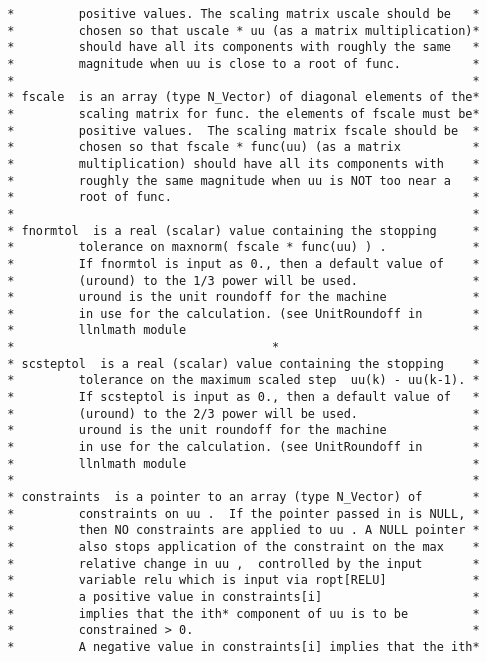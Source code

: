 \begin{verbatim}
 *         positive values. The scaling matrix uscale should be   *
 *         chosen so that uscale * uu (as a matrix multiplication)*
 *         should have all its components with roughly the same   *
 *         magnitude when uu is close to a root of func.          *
 *                                                                *
 * fscale  is an array (type N_Vector) of diagonal elements of the*
 *         scaling matrix for func. the elements of fscale must be*
 *         positive values.  The scaling matrix fscale should be  *
 *         chosen so that fscale * func(uu) (as a matrix          *
 *         multiplication) should have all its components with    *
 *         roughly the same magnitude when uu is NOT too near a   *
 *         root of func.                                          *
 *                                                                *
 * fnormtol  is a real (scalar) value containing the stopping     *
 *         tolerance on maxnorm( fscale * func(uu) ) .            *
 *         If fnormtol is input as 0., then a default value of    *
 *         (uround) to the 1/3 power will be used.                *
 *         uround is the unit roundoff for the machine            *
 *         in use for the calculation. (see UnitRoundoff in       *
 *         llnlmath module                                        *
 *        							  *
 * scsteptol  is a real (scalar) value containing the stopping    *
 *         tolerance on the maximum scaled step  uu(k) - uu(k-1). *
 *         If scsteptol is input as 0., then a default value of   *
 *         (uround) to the 2/3 power will be used.                *
 *         uround is the unit roundoff for the machine            *
 *         in use for the calculation. (see UnitRoundoff in       *
 *         llnlmath module                                        *
 *                                                                *
 * constraints  is a pointer to an array (type N_Vector) of       *
 *         constraints on uu .  If the pointer passed in is NULL, *
 *         then NO constraints are applied to uu . A NULL pointer *
 *         also stops application of the constraint on the max    *
 *         relative change in uu ,  controlled by the input       *
 *         variable relu which is input via ropt[RELU]            *
 *         a positive value in constraints[i]                     *
 *         implies that the ith* component of uu is to be         *
 *         constrained > 0.                                       *
 *         A negative value in constraints[i] implies that the ith*

\end{verbatim}
